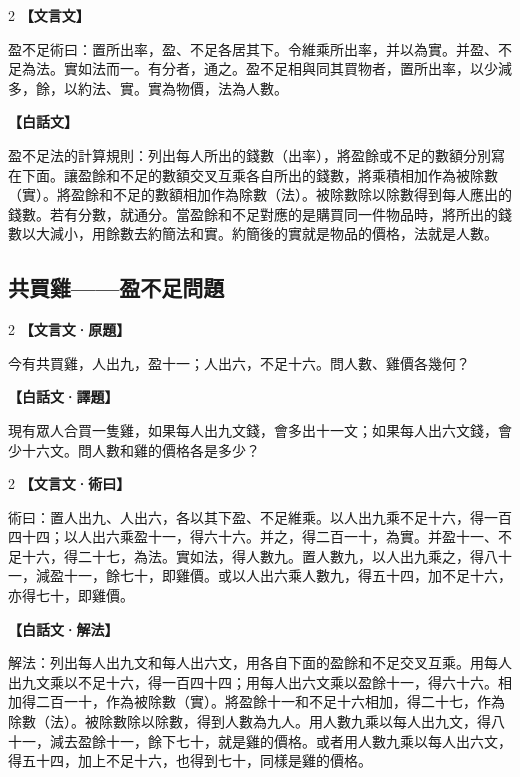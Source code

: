 \documentclass[11pt,a4paper]{article}
\newcommand{\zhc}{}[1]{{\CJKfamily{\CJKrmdefault}#1}}  %
\newcommand{\zhm}[1]{{\CJKfamily{\CJKrmdefault}#1}}  %
\newenvironment{prob bilingual}[1][]{%
  \begin{paracol}{2}%
  \setlength{\columnseprule}{0.4pt}%
}{%
  \end{paracol}%
  \medskip%
}
\begin{document}
\begin{paracol}{2}
\switchcolumn[0]
\noindent\textbf{\textcolor{notecolor}{\zhc{【文言文】}}}\par\smallskip
\zhc{
盈不足術曰：置所出率，盈、不足各居其下。令維乘所出率，并以為實。并盈、不足為法。實如法而一。有分者，通之。盈不足相與同其買物者，置所出率，以少減多，餘，以約法、實。實為物價，法為人數。
}

\switchcolumn[1]
\noindent\textbf{\textcolor{notecolor}{\zhm{【白話文】}}}\par\smallskip
\zhm{
盈不足法的計算規則：列出每人所出的錢數（出率），將盈餘或不足的數額分別寫在下面。讓盈餘和不足的數額交叉互乘各自所出的錢數，將乘積相加作為被除數（實）。將盈餘和不足的數額相加作為除數（法）。被除數除以除數得到每人應出的錢數。若有分數，就通分。當盈餘和不足對應的是購買同一件物品時，將所出的錢數以大減小，用餘數去約簡法和實。約簡後的實就是物品的價格，法就是人數。
}
\end{paracol}

\medskip

\subsection{\zhc{共買雞——盈不足問題}}

\begin{paracol}{2}
\switchcolumn[0]
\noindent\textbf{\textcolor{notecolor}{\zhc{【文言文·原題】}}}\par\smallskip
\zhc{
今有共買雞，人出九，盈十一；人出六，不足十六。問人數、雞價各幾何？
}

\switchcolumn[1]
\noindent\textbf{\textcolor{notecolor}{\zhm{【白話文·譯題】}}}\par\smallskip
\zhm{
現有眾人合買一隻雞，如果每人出九文錢，會多出十一文；如果每人出六文錢，會少十六文。問人數和雞的價格各是多少？
}
\end{paracol}

\medskip

\begin{paracol}{2}
\switchcolumn[0]
\noindent\textbf{\textcolor{notecolor}{\zhc{【文言文·術曰】}}}\par\smallskip
\zhc{
術曰：置人出九、人出六，各以其下盈、不足維乘。以人出九乘不足十六，得一百四十四；以人出六乘盈十一，得六十六。并之，得二百一十，為實。并盈十一、不足十六，得二十七，為法。實如法，得人數九。置人數九，以人出九乘之，得八十一，減盈十一，餘七十，即雞價。或以人出六乘人數九，得五十四，加不足十六，亦得七十，即雞價。
}

\switchcolumn[1]
\noindent\textbf{\textcolor{notecolor}{\zhm{【白話文·解法】}}}\par\smallskip
\zhm{
解法：列出每人出九文和每人出六文，用各自下面的盈餘和不足交叉互乘。用每人出九文乘以不足十六，得一百四十四；用每人出六文乘以盈餘十一，得六十六。相加得二百一十，作為被除數（實）。將盈餘十一和不足十六相加，得二十七，作為除數（法）。被除數除以除數，得到人數為九人。用人數九乘以每人出九文，得八十一，減去盈餘十一，餘下七十，就是雞的價格。或者用人數九乘以每人出六文，得五十四，加上不足十六，也得到七十，同樣是雞的價格。
}
\end{paracol}
\end{document}
